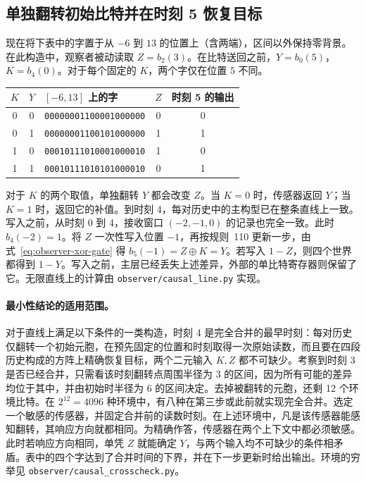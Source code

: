 \subsection{单独翻转初始比特并在时刻 5 恢复目标}
\label{sec:observer-return}

现在将下表中的字置于从 $-6$ 到 $13$ 的位置上（含两端），区间以外保持零背景。在此构造中，观察者被动读取 $Z=b_2(3)$。在比特送回之前，$Y=b_0(5)$，$K=b_4(0)$。对于每个固定的 $K$，两个字仅在位置 $5$ 不同。

\begin{center}
\begin{tabular}{cc l cc}
$K$ & $Y$ & $[-6,13]$ 上的字 & $Z$ & 时刻 5 的输出 \\
\hline
0 & 0 & \texttt{00000001100001000000} & 0 & 0 \\
0 & 1 & \texttt{00000001100101000000} & 1 & 1 \\
1 & 0 & \texttt{00010111010001000010} & 1 & 0 \\
1 & 1 & \texttt{00010111010101000010} & 0 & 1
\end{tabular}
\end{center}

对于 $K$ 的两个取值，单独翻转 $Y$ 都会改变 $Z$。当 $K=0$ 时，传感器返回 $Y$；当 $K=1$ 时，返回它的补值。到时刻 4，每对历史中的主构型已在整条直线上一致。写入之前，从时刻 0 到 4，接收窗口 $(-2,-1,0)$ 的记录也完全一致。此时 $b_4(-2)=1$。将 $Z$ 一次性写入位置 $-1$，再按规则~110 更新一步，由式~\eqref{eq:observer-xor-gate} 得 $b_5(-1)=Z\oplus K=Y$。若写入 $1-Z$，则四个世界都得到 $1-Y$。写入之前，主层已经丢失上述差异，外部的单比特寄存器则保留了它。无限直线上的计算由 \nolinkurl{observer/causal_line.py} 实现。

\paragraph{最小性结论的适用范围。}
对于直线上满足以下条件的一类构造，时刻 4 是完全合并的最早时刻：每对历史仅翻转一个初始元胞，在预先固定的位置和时刻取得一次原始读数，而且要在四段历史构成的方阵上精确恢复目标，两个二元输入 $K,Z$ 都不可缺少。考察到时刻 3 是否已经合并，只需看该时刻翻转点周围半径为 3 的区间，因为所有可能的差异均位于其中，并由初始时半径为 6 的区间决定。去掉被翻转的元胞，还剩 12 个环境比特。在 $2^{12}=4096$ 种环境中，有八种在第三步或此前就实现完全合并。选定一个敏感的传感器，并固定合并前的读数时刻。在上述环境中，凡是该传感器能感知翻转，其响应方向就都相同。为精确作答，传感器在两个上下文中都必须敏感。此时若响应方向相同，单凭 $Z$ 就能确定 $Y$，与两个输入均不可缺少的条件相矛盾。表中的四个字达到了合并时间的下界，并在下一步更新时给出输出。环境的穷举见 \nolinkurl{observer/causal_crosscheck.py}。


